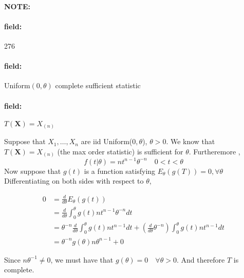 \documentclass[12pt]{article}
\newenvironment{note}{\paragraph{NOTE:}}{}
\newenvironment{field}{\paragraph{field:}}{}
\begin{document}
\begin{note} \begin{field} \tiny 276 \end{field}
  \begin{field}
    Uniform$(0,\theta)$ complete sufficient statistic
  \end{field}
  \begin{field}
    $T(\mathbf{X}) = X_{(n)}$

    Suppose that $X_1, \ldots , X_n$ are iid Uniform($0,\theta$), $\theta > 0$. We know that $T(\mathbf{X}) = X_{(n)}$ (the max order statistic) is sufficient for $\theta$. Furtheremore ,
    $$ f(t|\theta) = nt^{n-1}\theta^{-n} \quad 0 < t < \theta$$
    Now suppose that $g(t)$ is a function satisfying $E_\theta(g(T)) =0, \forall \theta$
    Differentiating on both sides with respect to $\theta$,

    \begin{align*}
       0 &= \frac{d}{d\theta} E_\theta(g(t))\\
       &= \frac{d}{d\theta} \int_0^\theta g(t)nt^{n-1}\theta^{-n} dt\\
       &= \theta^{-n}\frac{d}{d\theta} \int_0^\theta g(t)nt^{n-1} dt + (\frac{d}{d\theta}\theta^{-n}) \int_0^\theta g(t)nt^{n-1}dt \\
       &= \theta^{-n}g(\theta)n\theta^{n-1} + 0
    \end{align*}

    Since $n\theta^{-1} \neq 0$, we must have that $g(\theta) =0 \quad \forall \theta> 0$. And therefore $T$ is complete.
  \end{field}
\end{note}
\end{document}
